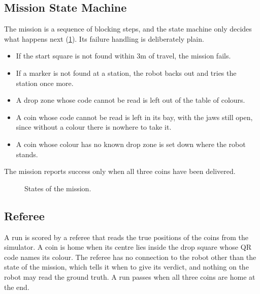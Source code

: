 \subsection{Mission State Machine}
\label{sec:statemachine}
The mission is a sequence of blocking steps, and the state machine only decides what happens
next (\cref{fig:states}). Its failure handling is deliberately plain.
\begin{itemize}
  \item If the start square is not found within 3\unit{m} of travel, the mission fails.
  \item If a marker is not found at a station, the robot backs out and tries the station once
        more.
  \item A drop zone whose code cannot be read is left out of the table of colours.
  \item A coin whose code cannot be read is left in its bay, with the jaws still open, since
        without a colour there is nowhere to take it.
  \item A coin whose colour has no known drop zone is set down where the robot stands.
\end{itemize}
The mission reports success only when all three coins have been delivered.

\begin{figure}[htbp]
  \centering
  \caption{States of the mission.}
  \label{fig:states}
\end{figure}

\subsection{Referee}
\label{sec:referee}
A run is scored by a referee that reads the true positions of the coins from the simulator.
A coin is home when its centre lies inside the drop square whose QR code names its colour.
The referee has no connection to the robot other than the state of the mission, which tells
it when to give its verdict, and nothing on the robot may read the ground truth. A run
passes when all three coins are home at the end.
